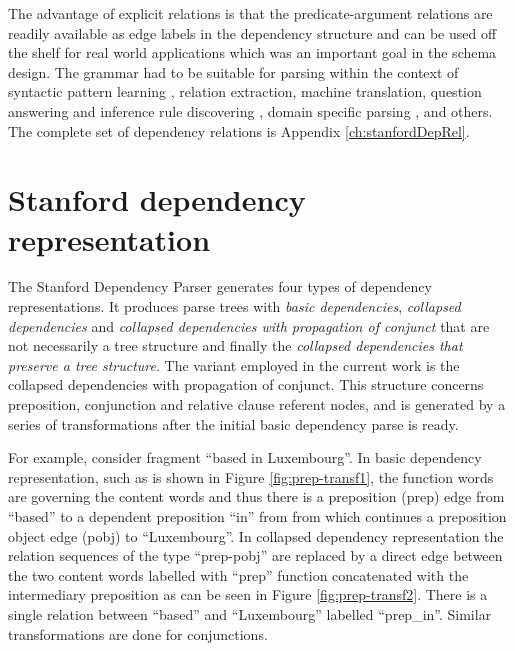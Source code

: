 The advantage of explicit relations is that the predicate-argument relations are readily available as edge labels in the dependency structure and can be used off the shelf for real world applications which was an important goal in the schema design. The grammar had to be suitable for parsing within the context of syntactic pattern learning \citep{snow2005learning}, relation extraction, machine translation, question answering and inference rule discovering \citep{lin2001discovery}, domain specific parsing \citep{clegg2007benchmarking}, and others. The complete set of dependency relations is Appendix \ref{ch:stanfordDepRel}.

\section{Stanford dependency representation}
\label{sec:collapsed-cc-output}
The Stanford Dependency Parser generates four types of dependency representations. It produces parse trees with \textit{basic dependencies}, \textit{collapsed dependencies} and \textit{collapsed dependencies with propagation of conjunct} that are not necessarily a tree structure and finally the \textit{collapsed dependencies that preserve a tree structure}. The variant employed in the current work is the collapsed dependencies with propagation of conjunct. This structure concerns preposition, conjunction and relative clause referent nodes, and is generated by a series of transformations after the initial basic dependency parse is ready.

For example, consider fragment ``based in Luxembourg''. In basic dependency representation, such as is shown in Figure \ref{fig:prep-transf1}, the function words are governing the content words and thus there is a preposition (prep) edge from ``based'' to a dependent preposition ``in'' from from which continues a preposition object edge (pobj) to ``Luxembourg''. In collapsed dependency representation the relation sequences of the type ``prep-pobj'' are replaced by a direct edge between the two content words labelled with ``prep'' function concatenated with the intermediary preposition as can be seen in Figure \ref{fig:prep-transf2}. There is a single relation between ``based'' and ``Luxembourg'' labelled ``prep\_in''. Similar transformations are done for conjunctions.

